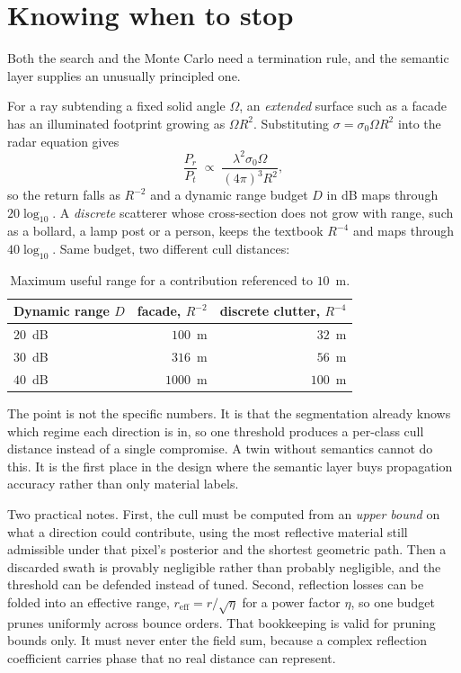 \documentclass[11pt,a4paper]{article}
\begin{document}
\section{Knowing when to stop}

Both the search and the Monte Carlo need a termination rule, and the semantic
layer supplies an unusually principled one.

For a ray subtending a fixed solid angle $\Omega$, an \emph{extended} surface such
as a facade has an illuminated footprint growing as $\Omega R^2$. Substituting
$\sigma = \sigma_0 \Omega R^2$ into the radar equation gives
\begin{equation}
  \frac{P_r}{P_t} \;\propto\; \frac{\lambda^2 \sigma_0 \Omega}{(4\pi)^3 R^{2}},
\end{equation}
so the return falls as $R^{-2}$ and a dynamic range budget $D$ in dB maps through
$20\log_{10}$. A \emph{discrete} scatterer whose cross-section does not grow with
range, such as a bollard, a lamp post or a person, keeps the textbook $R^{-4}$ and
maps through $40\log_{10}$. Same budget, two different cull distances:

\begin{table}[h]
\centering
\begin{tabular}{lrr}
\toprule
Dynamic range $D$ & facade, $R^{-2}$ & discrete clutter, $R^{-4}$ \\
\midrule
$20$~dB & $100$~m  & $32$~m  \\
$30$~dB & $316$~m  & $56$~m  \\
$40$~dB & $1000$~m & $100$~m \\
\bottomrule
\end{tabular}
\caption{Maximum useful range for a contribution referenced to $10$~m.}
\end{table}

The point is not the specific numbers. It is that the segmentation already knows
which regime each direction is in, so one threshold produces a per-class cull
distance instead of a single compromise. A twin without semantics cannot do this.
It is the first place in the design where the semantic layer buys propagation
accuracy rather than only material labels.

Two practical notes. First, the cull must be computed from an \emph{upper bound}
on what a direction could contribute, using the most reflective material still
admissible under that pixel's posterior and the shortest geometric path. Then a
discarded swath is provably negligible rather than probably negligible, and the
threshold can be defended instead of tuned. Second, reflection losses can be
folded into an effective range, $r_{\text{eff}} = r/\sqrt{\eta}$ for a power
factor $\eta$, so one budget prunes uniformly across bounce orders. That bookkeeping
is valid for pruning bounds only. It must never enter the field sum, because a
complex reflection coefficient carries phase that no real distance can represent.
\end{document}
